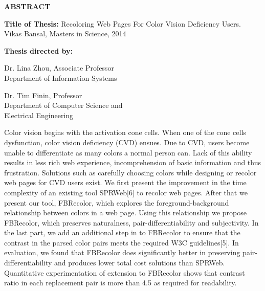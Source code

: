 \newpage
\pagestyle{empty}

\begin{center}
\vspace{0.1in}
\large{\bf ABSTRACT} \par  
\bigskip \bigskip
\end{center}

\begin{flushleft}
{\bf Title of Thesis:} Recoloring Web Pages For Color Vision Deficiency Users.\\
Vikas Bansal, Masters in Science, 2014 \\
\begin{singlespace}
{\bf Thesis directed by:}{\hspace{2.5mm}} \parbox[t]{3in}{Dr. Lina Zhou, Associate Professor\\
Department of Information Systems}
\end{singlespace}
\begin{singlespace}
{\hspace{37.9mm}}\parbox[t]{3in}{Dr. Tim Finin, Professor\\
Department of Computer Science and \\ Electrical Engineering}
\end{singlespace}
\end{flushleft}

Color vision begins with the activation cone cells. When one of the cone cells dysfunction, color vision deficiency (CVD) ensues. Due to CVD, users become unable to differentiate as many colors a normal person can. Lack of this ability results in less rich web experience, incomprehension of basic information and thus frustration. Solutions such as carefully choosing colors while designing or recolor web pages for CVD users exist. We first present the improvement in the time complexity of an existing tool SPRWeb[6] to recolor web pages. After that we present our tool, FBRecolor, which explores the foreground-background relationship between colors in a web page. Using this relationship we propose FBRecolor, which preserves naturalness, pair-differentiability and subjectivity. In the last part, we add an additional step in to FBRecolor to ensure that the contrast in the parsed  color pairs meets the required W3C guidelines[5]. In evaluation, we found that FBRecolor does significantly better in preserving pair-differentiability and produces lower total cost solutions than SPRWeb. Quantitative experimentation of extension to FBRecolor shows that contrast ratio in each replacement pair is more than 4.5 as required for readability.

\par\vfil

